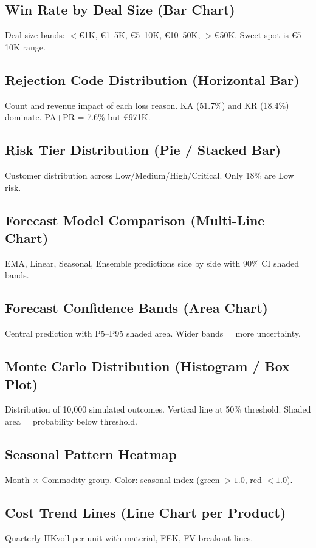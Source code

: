 \documentclass[11pt,a4paper]{article}
\newcommand{\EUR}{\euro{}}
\begin{document}
\subsection{Win Rate by Deal Size (Bar Chart)}
Deal size bands: $<$\EUR1K, \EUR1--5K, \EUR5--10K, \EUR10--50K, $>$\EUR50K. Sweet spot is \EUR5--10K range.

\subsection{Rejection Code Distribution (Horizontal Bar)}
Count and revenue impact of each loss reason. KA (51.7\%) and KR (18.4\%) dominate. PA+PR = 7.6\% but \EUR971K.

\subsection{Risk Tier Distribution (Pie / Stacked Bar)}
Customer distribution across Low/Medium/High/Critical. Only 18\% are Low risk.

\subsection{Forecast Model Comparison (Multi-Line Chart)}
EMA, Linear, Seasonal, Ensemble predictions side by side with 90\% CI shaded bands.

\subsection{Forecast Confidence Bands (Area Chart)}
Central prediction with P5--P95 shaded area. Wider bands = more uncertainty.

\subsection{Monte Carlo Distribution (Histogram / Box Plot)}
Distribution of 10{,}000 simulated outcomes. Vertical line at 50\% threshold. Shaded area = probability below threshold.

\subsection{Seasonal Pattern Heatmap}
Month $\times$ Commodity group. Color: seasonal index (green $> 1.0$, red $< 1.0$).

\subsection{Cost Trend Lines (Line Chart per Product)}
Quarterly HKvoll per unit with material, FEK, FV breakout lines.
\end{document}
